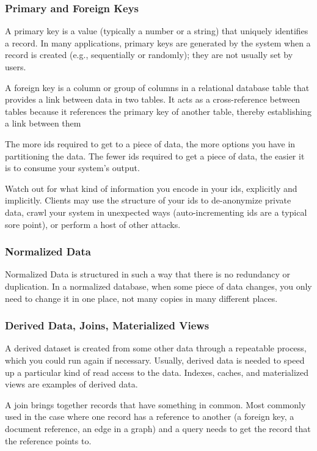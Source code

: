 \documentclass{article}
\begin{document}
    \subsubsection{Primary and Foreign Keys}
    A primary key is a value (typically a number or a string) that uniquely identifies a record. In many applications, primary keys are generated by the system when a record is created (e.g., sequentially or randomly); they are not usually set by users.
    
    A foreign key is a column or group of columns in a relational database table that provides a link between data in two tables. It acts as a cross-reference between tables because it references the primary key of another table, thereby establishing a link between them
    
    The more ids required to get to a piece of data, the more options you have in partitioning the data. The fewer ids required to get a piece of data, the easier it is to consume your system’s output.
    
    Watch out for what kind of information you encode in your ids, explicitly and implicitly. Clients may use the structure of your ids to de-anonymize private data, crawl your system in unexpected ways (auto-incrementing ids are a typical sore point), or perform a host of other attacks.
    
    
    \subsubsection{Normalized Data}
    Normalized Data is structured in such a way that there is no redundancy or duplication. In a normalized database, when some piece of data changes, you only need to change it in one place, not many copies in many different places.
    
    \subsubsection{Derived Data, Joins, Materialized Views}
    A derived dataset is created from some other data through a repeatable process, which you could run again if necessary. Usually, derived data is needed to speed up a particular kind of read access to the data.  Indexes, caches, and materialized views are examples of derived data.
    
    A join brings together records that have something in common. Most commonly used in the case where one record has a reference to another (a foreign key, a document reference, an edge in a graph) and a query needs to get the record that the reference points to.
    
\end{document}
